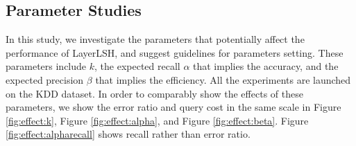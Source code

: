 \subsection{Parameter Studies}
\label{sec:expr:param}

In this study, we investigate the parameters that potentially affect the performance of LayerLSH, and suggest guidelines for parameters setting. These parameters include $k$, the expected recall $\alpha$ that implies the accuracy, and the expected precision $\beta$ that implies the efficiency. All the experiments are launched on the KDD dataset. In order to comparably show the effects of these parameters, we show the error ratio and query cost in the same scale in Figure \ref{fig:effect:k}, Figure \ref{fig:effect:alpha}, and Figure \ref{fig:effect:beta}. Figure \ref{fig:effect:alpharecall} shows recall rather than error ratio.

